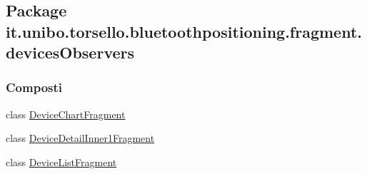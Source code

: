 \hypertarget{namespaceit_1_1unibo_1_1torsello_1_1bluetoothpositioning_1_1fragment_1_1devicesObservers}{}\subsection{Package it.\+unibo.\+torsello.\+bluetoothpositioning.\+fragment.\+devices\+Observers}
\label{namespaceit_1_1unibo_1_1torsello_1_1bluetoothpositioning_1_1fragment_1_1devicesObservers}
\subsubsection*{Composti}
\begin{DoxyCompactItemize}
\item 
class \hyperlink{classit_1_1unibo_1_1torsello_1_1bluetoothpositioning_1_1fragment_1_1devicesObservers_1_1DeviceChartFragment}{Device\+Chart\+Fragment}
\item 
class \hyperlink{classit_1_1unibo_1_1torsello_1_1bluetoothpositioning_1_1fragment_1_1devicesObservers_1_1DeviceDetailInner1Fragment}{Device\+Detail\+Inner1\+Fragment}
\item 
class \hyperlink{classit_1_1unibo_1_1torsello_1_1bluetoothpositioning_1_1fragment_1_1devicesObservers_1_1DeviceListFragment}{Device\+List\+Fragment}
\end{DoxyCompactItemize}
